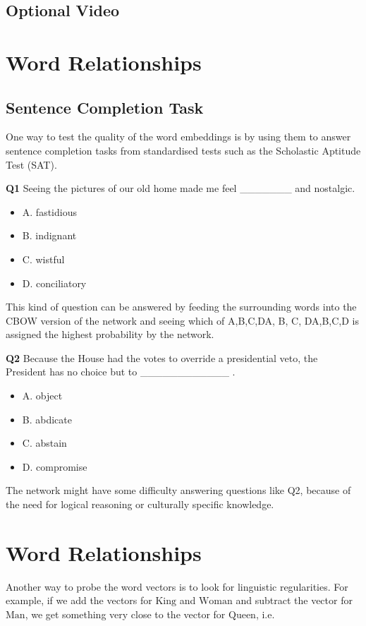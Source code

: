 \documentclass[11pt]{article}
\begin{document}
\subsection{Optional Video}\label{subsec:optional-video3}

\section{Word Relationships}\label{sec:word-relationships}
\subsection{Sentence Completion Task}\label{subsec:sentence-completion-task}

One way to test the quality of the word embeddings is by using them to answer sentence completion tasks from standardised tests such as the Scholastic Aptitude Test (SAT).

\textbf{Q1}
Seeing the pictures of our old home made me feel _______ and nostalgic.

\begin{itemize}
  \item A. fastidious
  \item B. indignant
  \item C. wistful
  \item D. conciliatory
\end{itemize}

This kind of question can be answered by feeding the surrounding words into the CBOW version of the network and seeing which of A,B,C,D{\rm A, B, C, D}A,B,C,D is assigned the highest probability by the network.

\textbf{Q2}
Because the House had the votes to override a presidential veto, the President has no choice but to ____________ .

\begin{itemize}
  \item A. object
  \item B. abdicate
  \item C. abstain
  \item D. compromise
\end{itemize}

The network might have some difficulty answering questions like Q2, because of the need for logical reasoning or culturally specific knowledge.

\section{Word Relationships}\label{sec:word-relationships2}
Another way to probe the word vectors is to look for linguistic regularities.
For example, if we add the vectors for $\text{King}$ and $\text{Woman}$ and subtract the vector for $\text{Man}$, we get something very close to the vector for $\text{Queen}$, i.e.
\end{document}
